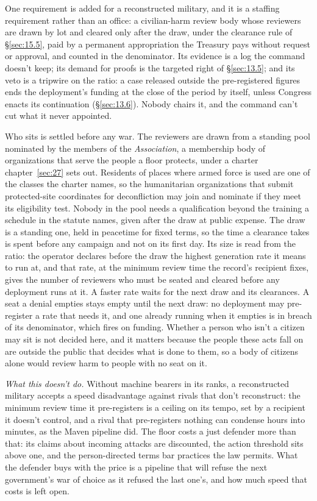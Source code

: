 One requirement is added for a reconstructed military, and it is a staffing requirement rather than an office: a civilian-harm review body whose reviewers are drawn by lot and cleared only after the draw, under the clearance rule of \S\ref{sec:15.5}, paid by a permanent appropriation the Treasury pays without request or approval, and counted in the denominator. Its evidence is a log the command doesn't keep; its demand for proofs is the targeted right of \S\ref{sec:13.5}; and its veto is a tripwire on the ratio: a case released outside the pre-registered figures ends the deployment's funding at the close of the period by itself, unless Congress enacts its continuation (\S\ref{sec:13.6}). Nobody chairs it, and the command can't cut what it never appointed.

Who sits is settled before any war. The reviewers are drawn from a standing pool nominated by the members of the \emph{Association}, a membership body of organizations that serve the people a floor protects, under a charter chapter~\ref{sec:27} sets out. Residents of places where armed force is used are one of the classes the charter names, so the humanitarian organizations that submit protected-site coordinates for deconfliction may join and nominate if they meet its eligibility test. Nobody in the pool needs a qualification beyond the training a schedule in the statute names, given after the draw at public expense. The draw is a standing one, held in peacetime for fixed terms, so the time a clearance takes is spent before any campaign and not on its first day. Its size is read from the ratio: the operator declares before the draw the highest generation rate it means to run at, and that rate, at the minimum review time the record's recipient fixes, gives the number of reviewers who must be seated and cleared before any deployment runs at it. A faster rate waits for the next draw and its clearances. A seat a denial empties stays empty until the next draw: no deployment may pre-register a rate that needs it, and one already running when it empties is in breach of its denominator, which fires on funding. Whether a person who isn't a citizen may sit is not decided here, and it matters because the people these acts fall on are outside the public that decides what is done to them, so a body of citizens alone would review harm to people with no seat on it.

\emph{What this doesn't do.} Without machine bearers in its ranks, a reconstructed military accepts a speed disadvantage against rivals that don't reconstruct: the minimum review time it pre-registers is a ceiling on its tempo, set by a recipient it doesn't control, and a rival that pre-registers nothing can condense hours into minutes, as the Maven pipeline did. The floor costs a just defender more than that: its claims about incoming attacks are discounted, the action threshold sits above one, and the person-directed terms bar practices the law permits. What the defender buys with the price is a pipeline that will refuse the next government's war of choice as it refused the last one's, and how much speed that costs is left open.

